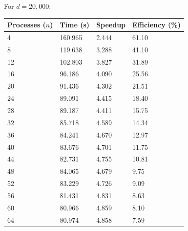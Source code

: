 \documentclass[11pt]{article}
\begin{document}
\begin{appendices}
\normalsize{
For $d=20,000$:}
\footnotesize{
\begin{center}
\begin{tabular}{|l|l|l|l|}
\hline
Processes ($n$) & Time (s) & Speedup & Efficiency (\%)\\
\hline
4 & 160.965 & 2.444 & 61.10\\
8 & 119.638 & 3.288 & 41.10\\
12 & 102.803 & 3.827 & 31.89\\
16 & 96.186 & 4.090 & 25.56\\
20 & 91.436 & 4.302 & 21.51\\
24 & 89.091 & 4.415 & 18.40\\
28 & 89.187 & 4.411 & 15.75\\
32 & 85.718 & 4.589 & 14.34\\
36 & 84.241 & 4.670 & 12.97\\
40 & 83.676 & 4.701 & 11.75\\
44 & 82.731 & 4.755 & 10.81\\
48 & 84.065 & 4.679 & 9.75\\
52 & 83.229 & 4.726 & 9.09\\
56 & 81.431 & 4.831 & 8.63\\
60 & 80.966 & 4.859 & 8.10\\
64 & 80.974 & 4.858 & 7.59\\
\hline
\end{tabular}
\end{center}}

\newpage
{\color{darkindigo}
}
\end{appendices}
\end{document}
